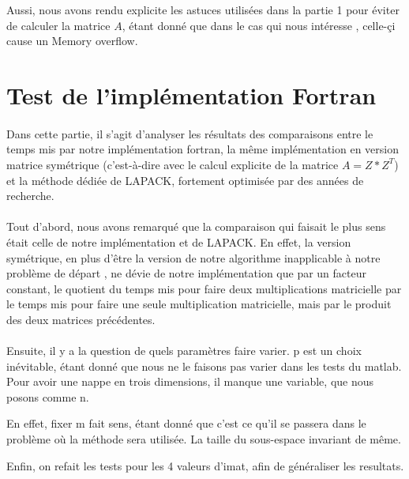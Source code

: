 \documentclass[a4paper,12pt]{article}
\begin{document}
    Aussi, nous avons rendu explicite les astuces utilisées dans la partie 1 pour
    éviter de calculer la matrice $A$, étant donné que dans le cas qui nous intéresse
    , celle-çi cause un Memory overflow.

\newpage
\section{Test de l'implémentation Fortran}

    \paragraph{}
    Dans cette partie, il s'agit d'analyser les résultats des comparaisons
    entre le temps mis par notre implémentation fortran, la même implémentation
    en version matrice symétrique (c'est-à-dire avec le calcul explicite de la
    matrice $A = Z*Z^T$) et la méthode dédiée de LAPACK, fortement optimisée
    par des années de recherche.

    \paragraph{}
    Tout d'abord, nous avons remarqué que la comparaison qui faisait le plus sens
    était celle de notre implémentation et de LAPACK. En effet, la version symétrique,
    en plus d'être la version de notre algorithme inapplicable à notre problème de départ
    , ne dévie de notre implémentation que par un facteur constant, le quotient du temps
    mis pour faire deux multiplications matricielle par le temps mis pour faire une seule
    multiplication matricielle, mais par le produit des deux matrices précédentes.

    \paragraph{}
    Ensuite, il y a la question de quels paramètres faire varier. p est un choix
    inévitable, étant donné que nous ne le faisons pas varier dans les tests du matlab.
    Pour avoir une nappe en trois dimensions, il manque une variable, que nous
    posons comme n.

    En effet, fixer m fait sens, étant donné que c'est ce qu'il se passera dans le
    problème où la méthode sera utilisée. La taille du sous-espace invariant de même.

    Enfin, on refait les tests pour les 4 valeurs d'imat, afin de généraliser les
    resultats.
\end{document}
